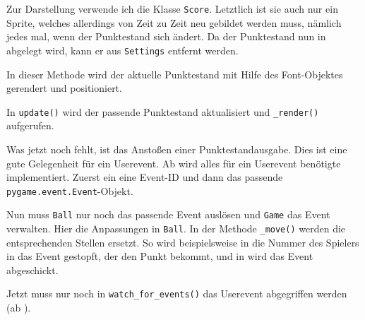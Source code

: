 Zur Darstellung verwende ich die Klasse \texttt{Score}. Letztlich ist sie auch nur ein Sprite, welches allerdings von Zeit zu Zeit neu gebildet werden muss, nämlich jedes mal, wenn der Punktestand sich ändert. Da der Punktestand nun in  abgelegt wird, kann er aus \texttt{Settings} entfernt werden.


In dieser Methode wird der aktuelle Punktestand mit Hilfe des Font-Objektes gerendert und positioniert.


In \texttt{update()} wird der passende Punktestand aktualisiert und \texttt{\_render()} aufgerufen. 


Was jetzt noch fehlt, ist das Anstoßen einer Punktestandausgabe. Dies ist eine gute Gelegenheit für ein Userevent. Ab  wird alles für ein Userevent benötigte implementiert. Zuerst ein eine Event-ID und dann das passende \texttt{pygame.e\-vent\-.E\-vent}-Objekt.


Nun muss \texttt{Ball} nur noch das passende Event auslösen und \texttt{Game} das Event verwalten. Hier die Anpassungen in \texttt{Ball}. In der Methode \texttt{\_move()} werden die entsprechenden Stellen ersetzt. So wird beispielsweise in  die Nummer des Spielers in das Event gestopft, der den Punkt bekommt, und in  wird das Event abgeschickt.


\newpage
Jetzt muss nur noch in \texttt{watch\_for\_events()} das Userevent abgegriffen werden (ab ).




